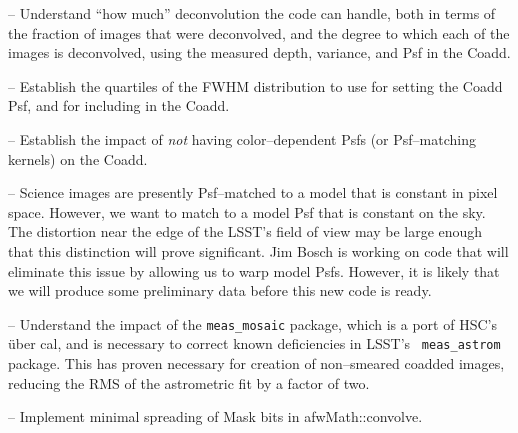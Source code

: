 \documentclass[prd, nofootinbib, floatfix, 11pt,tightenlines,times]{article}
\begin{document}




-- Understand ``how much'' deconvolution the code can handle,
both in terms of the fraction of images that were deconvolved, and the
degree to which each of the images is deconvolved, using the measured 
depth, variance, and Psf in the Coadd.

-- Establish the quartiles of the FWHM distribution to use for setting the Coadd Psf, 
and for including in the Coadd.

-- Establish the impact of {\it not} having color--dependent Psfs (or Psf--matching kernels) on the Coadd.

-- Science images are presently Psf--matched to a model that is constant in pixel space.
However, we want to match to a model Psf that is constant on the sky.  The
distortion near the edge of the LSST's field of view may be large enough
that this distinction will prove significant. Jim Bosch is working on code
that will eliminate this issue by allowing us to warp model Psfs.
However, it is likely that we will produce some preliminary data before this new code is ready.

-- Understand the impact of the {\tt meas\_mosaic} package, which is a port of HSC's \"{u}ber
cal, and is necessary to correct known deficiencies in LSST's {\tt
  meas\_astrom} package.  This has proven necessary for creation of
non--smeared coadded images, reducing the RMS of the astrometric fit
by a factor of two.  

-- Implement minimal spreading of Mask bits in afwMath::convolve.

%
%
%
%
%
\end{document}
